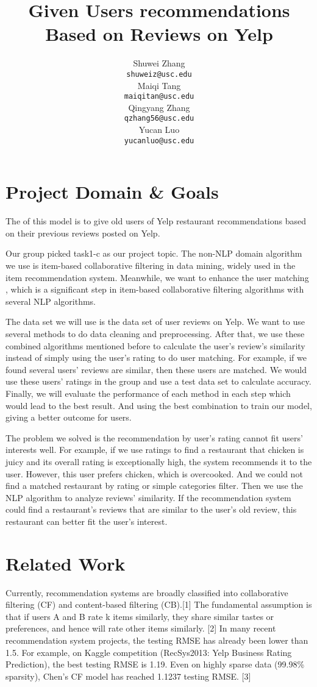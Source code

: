 \documentclass[11pt]{article}
\title{Given Users recommendations Based on Reviews on Yelp }
\author{
  Shuwei Zhang \\
  {\tt shuweiz@usc.edu} \\\And
  Maiqi Tang \\
  {\tt maiqitan@usc.edu} \\\And
  Qingyang Zhang \\
  {\tt qzhang56@usc.edu} \\\And
   Yucan Luo \\
  {\tt yucanluo@usc.edu}
  }
\date{}
\begin{document}
\maketitle

\section{Project Domain \& Goals}
The of this model is to give old users of Yelp restaurant recommendations based on their previous reviews posted on Yelp. 

Our group picked task1-c as our project topic. The non-NLP domain algorithm we use is item-based collaborative filtering in data mining, widely used in the item recommendation system. Meanwhile, we want to enhance the user matching , which is a significant step in item-based collaborative filtering algorithms with several NLP algorithms. 

The data set we will use is the data set of user reviews on Yelp. We want to use several methods to do data cleaning and preprocessing. After that, we use these combined algorithms mentioned before to calculate the user’s review’s similarity instead of simply using the user's rating to do user matching. For example, if we found several users’ reviews are similar, then these users are matched. We would use these users’ ratings in the group and use a test data set to calculate accuracy. Finally, we will evaluate the performance of each method in each step which would lead to the best result. And using the best combination to train our model, giving a better outcome for users.

The problem we solved is the recommendation by user's rating cannot fit users' interests well. For example, if we use ratings to find a restaurant that chicken is juicy and its overall rating is exceptionally high, the system recommends it to the user. However, this user prefers chicken, which is overcooked. And we could not find a matched restaurant by rating or simple categories filter. Then we use the NLP algorithm to analyze reviews' similarity. If the recommendation system could find a restaurant's reviews that are similar to the user's old review, this restaurant can better fit the user's interest.

\section{Related Work}
Currently, recommendation systems are broadly classified into collaborative filtering (CF) and content-based filtering (CB).[1] The fundamental assumption is that if users A and B rate k items similarly, they share similar tastes or preferences, and hence will rate other items similarly. [2] In many recent recommendation system projects, the testing RMSE has already been lower than 1.5. For example, on Kaggle competition (RecSys2013: Yelp Business Rating Prediction), the best testing RMSE is 1.19. Even on highly sparse data (99.98\% sparsity), Chen’s CF model has reached 1.1237 testing RMSE. [3]
\end{document}
